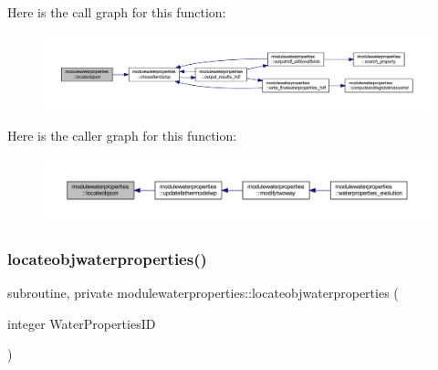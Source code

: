 Here is the call graph for this function\+:\nopagebreak
\begin{figure}[H]
\begin{center}
\leavevmode
\includegraphics[width=350pt]{namespacemodulewaterproperties_aa9cca4cb017da12a540fca143edcc19f_cgraph}
\end{center}
\end{figure}
Here is the caller graph for this function\+:\nopagebreak
\begin{figure}[H]
\begin{center}
\leavevmode
\includegraphics[width=350pt]{namespacemodulewaterproperties_aa9cca4cb017da12a540fca143edcc19f_icgraph}
\end{center}
\end{figure}
\mbox{\label{namespacemodulewaterproperties_ae4516d6c7f3687b0293515314b0ade90}} 
\subsubsection{\texorpdfstring{locateobjwaterproperties()}{locateobjwaterproperties()}}
{\footnotesize\ttfamily subroutine, private modulewaterproperties\+::locateobjwaterproperties (\begin{DoxyParamCaption}\item[{integer}]{Water\+Properties\+ID }\end{DoxyParamCaption})\hspace{0.3cm}{\ttfamily [private]}}

